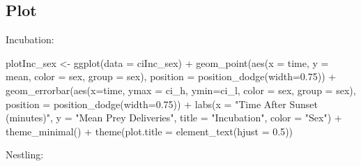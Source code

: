 \documentclass[
]{article}
\newenvironment{Shaded}{\begin{snugshade}}{\end{snugshade}}
\newcommand{\AttributeTok}[1]{\textcolor[rgb]{0.77,0.63,0.00}{#1}}
\newcommand{\FloatTok}[1]{\textcolor[rgb]{0.00,0.00,0.81}{#1}}
\newcommand{\FunctionTok}[1]{\textcolor[rgb]{0.00,0.00,0.00}{#1}}
\newcommand{\NormalTok}[1]{#1}
\newcommand{\OtherTok}[1]{\textcolor[rgb]{0.56,0.35,0.01}{#1}}
\newcommand{\SpecialCharTok}[1]{\textcolor[rgb]{0.00,0.00,0.00}{#1}}
\newcommand{\StringTok}[1]{\textcolor[rgb]{0.31,0.60,0.02}{#1}}
\begin{document}
\hypertarget{plot}{%
\subsection{Plot}\label{plot}}

Incubation:

\begin{Shaded}
\begin{Highlighting}[]
\NormalTok{plotInc\_sex }\OtherTok{\textless{}{-}} \FunctionTok{ggplot}\NormalTok{(}\AttributeTok{data =}\NormalTok{ ciInc\_sex) }\SpecialCharTok{+}
  \FunctionTok{geom\_point}\NormalTok{(}\FunctionTok{aes}\NormalTok{(}\AttributeTok{x =}\NormalTok{ time, }\AttributeTok{y =}\NormalTok{ mean, }\AttributeTok{color =}\NormalTok{ sex, }\AttributeTok{group =}\NormalTok{ sex),}
             \AttributeTok{position =} \FunctionTok{position\_dodge}\NormalTok{(}\AttributeTok{width=}\FloatTok{0.75}\NormalTok{)) }\SpecialCharTok{+}
  \FunctionTok{geom\_errorbar}\NormalTok{(}\FunctionTok{aes}\NormalTok{(}\AttributeTok{x=}\NormalTok{time, }\AttributeTok{ymax =}\NormalTok{ ci\_h, }\AttributeTok{ymin=}\NormalTok{ci\_l, }\AttributeTok{color =}\NormalTok{ sex, }
                    \AttributeTok{group =}\NormalTok{ sex),}
                \AttributeTok{position =} \FunctionTok{position\_dodge}\NormalTok{(}\AttributeTok{width=}\FloatTok{0.75}\NormalTok{)) }\SpecialCharTok{+}
  \FunctionTok{labs}\NormalTok{(}\AttributeTok{x =} \StringTok{"Time After Sunset (minutes)"}\NormalTok{, }\AttributeTok{y =} \StringTok{"Mean Prey Deliveries"}\NormalTok{, }
       \AttributeTok{title =} \StringTok{"Incubation"}\NormalTok{, }\AttributeTok{color =} \StringTok{"Sex"}\NormalTok{) }\SpecialCharTok{+}
  \FunctionTok{theme\_minimal}\NormalTok{() }\SpecialCharTok{+}
  \FunctionTok{theme}\NormalTok{(}\AttributeTok{plot.title =} \FunctionTok{element\_text}\NormalTok{(}\AttributeTok{hjust =} \FloatTok{0.5}\NormalTok{))}
\end{Highlighting}
\end{Shaded}

Nestling:
\end{document}
